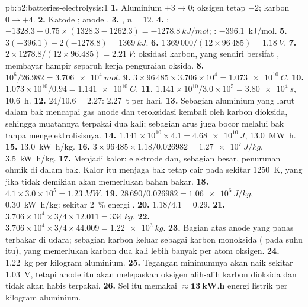 \begin{solution}{pb:b2:batteries-electrolysis:1}
\textbf{1.} Aluminium $+3 \to 0$; oksigen tetap $-2$; karbon $0 \to +4$.
\textbf{2.} Katode ; anode .
\textbf{3.} , $n = 12$.
\textbf{4.} : $-1328.3 + 0.75 \times (1328.3 - 1262.3) = \qty{-1278.8}{kJ/mol}$;
: \qty{-396.1}{kJ/mol}.
\textbf{5.} $3(-396.1) - 2(-1278.8) = \qty{+1369}{kJ}$.
\textbf{6.} $1\,369\,000/(12 \times 96\,485) = \qty{1.18}{V}$.
\textbf{7.} $2 \times 1278.8/(12 \times 96.485) = \qty{2.21}{V}$: oksidasi
karbon, yang sendiri bersifat , membayar hampir separuh kerja
penguraian oksida.
\textbf{8.} $10^6/26.982 = \qty{3.706e4}{mol}$.
\textbf{9.} $3 \times 96\,485 \times 3.706 \times 10^4 = \qty{1.073e10}{C}$.
\textbf{10.} $1.073 \times 10^{10}/0.94 = \qty{1.141e10}{C}$.
\textbf{11.} $1.141 \times 10^{10}/3.0 \times 10^5 = \qty{3.80e4}{s}$, \qty{10.6}{h}.
\textbf{12.} $24/10.6 = 2.27$: \qty{2.27}{t} per hari.
\textbf{13.} Sebagian aluminium yang larut dalam bak mencapai gas anode dan
teroksidasi kembali oleh karbon dioksida, sehingga muatannya terpakai dua
kali; sebagian arus juga bocor melalui bak tanpa mengelektrolisisnya.
\textbf{14.} $1.141 \times 10^{10} \times 4.1 = \qty{4.68e10}{J}$, \qty{13.0}{MW.h}.
\textbf{15.} \qty{13.0}{kW.h/kg}.
\textbf{16.} $3 \times 96\,485 \times 1.18/0.026982 = \qty{1.27e7}{J/kg}$,
\qty{3.5}{kW.h/kg}.
\textbf{17.} Menjadi kalor:  elektrode dan, sebagian besar,
penurunan ohmik di dalam bak. Kalor itu menjaga bak tetap cair pada sekitar
\qty{1250}{K}, yang jika tidak demikian akan memerlukan bahan bakar.
\textbf{18.} $4.1 \times 3.0 \times 10^5 = \qty{1.23}{MW}$.
\textbf{19.} $28\,690/0.026982 = \qty{1.06e6}{J/kg}$, \qty{0.30}{kW.h/kg}:
sekitar 2~\% energi .
\textbf{20.} $1.18/4.1 = 0.29$.
\textbf{21.} $3.706 \times 10^4 \times 3/4 \times 12.011 = \qty{334}{kg}$.
\textbf{22.} $3.706 \times 10^4 \times 3/4 \times 44.009 = \qty{1.22e3}{kg}$.
\textbf{23.} Bagian atas anode yang panas terbakar di udara; sebagian karbon
keluar sebagai karbon monoksida ( pada suhu itu), yang
memerlukan karbon dua kali lebih banyak per atom oksigen.
\textbf{24.} \qty{1.22}{kg}  per kilogram aluminium.
\textbf{25.} Tegangan minimumnya akan naik sekitar \qty{1.03}{V}, tetapi
anode itu akan melepaskan oksigen alih-alih karbon dioksida dan tidak akan
habis terpakai.
\textbf{26.} Sel itu memakai $\boldsymbol{\approx \qty{13}{kW.h}}$ energi
listrik per kilogram aluminium.
\end{solution}
